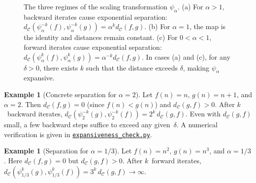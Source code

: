 \documentclass[11pt,a4paper]{article}
\newcommand{\repourl}{https://github.com/gabayae/expansive-homeomorphisms-complexity-qmetric}
\theoremstyle{plain}
\theoremstyle{definition}
\newtheorem{exampleinner}[theoreminner]{Example}
\newenvironment{example}[1][]{\begin{exampleinner}[#1]}{\end{exampleinner}}
\newcommand{\C}{\mathcal{C}}
\begin{document}
\begin{figure}[H]
\vspace{0.2cm}
\caption{The three regimes of the scaling transformation $\psi_\alpha$. 
(a) For $\alpha>1$, backward iterates cause exponential separation: 
$d_\C(\psi_\alpha^{-k}(f),\psi_\alpha^{-k}(g)) = \alpha^k d_\C(f,g)$. 
(b) For $\alpha=1$, the map is the identity and distances remain constant. 
(c) For $0<\alpha<1$, forward iterates cause exponential separation: 
$d_\C(\psi_\alpha^k(f),\psi_\alpha^k(g)) = \alpha^{-k} d_\C(f,g)$. 
In cases (a) and (c), for any $\delta>0$, there exists $k$ such that the 
distance exceeds $\delta$, making $\psi_\alpha$ expansive.}
\label{fig:three-cases}
\end{figure}

\begin{example}[Concrete separation for $\alpha=2$]\label{ex:concrete-sep}
Let $f(n)=n$, $g(n)=n+1$, and $\alpha=2$.  Then $d_\C(f,g)=0$
(since $f(n)<g(n)$) and $d_\C(g,f)>0$.  After $k$~backward
iterates, $d_\C(\psi_2^{-k}(g),\psi_2^{-k}(f))=2^k\,d_\C(g,f)$.
Even with $d_\C(g,f)$ small, a few backward steps suffice to
exceed any given~$\delta$.  A numerical verification is given in
\href{\repourl/blob/main/code/python/expansiveness_check.py}{\texttt{expansiveness\_check.py}}.
\end{example}

\begin{example}[Separation for $\alpha=1/3$]\label{ex:sep-third}
Let $f(n)=n^2$, $g(n)=n^3$, and $\alpha=1/3$.  Here
$d_\C(f,g)=0$ but $d_\C(g,f)>0$.  After $k$~forward iterates,
$d_\C(\psi_{1/3}^k(g),\psi_{1/3}^k(f))=3^k\,d_\C(g,f)\to\infty$.
\end{example}
\end{document}
